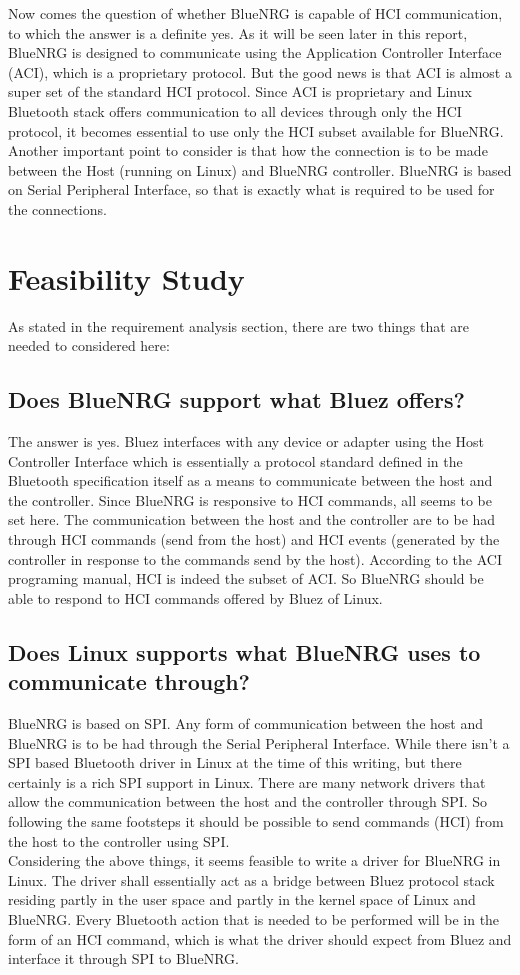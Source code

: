 Now comes the question of whether BlueNRG is capable of HCI communication, to which the answer is a definite yes. As it will be seen later in this report, BlueNRG is designed to communicate using the Application Controller Interface (ACI), which is a proprietary protocol. But the good news is that ACI is almost a super set of the standard HCI protocol. Since ACI is proprietary and Linux Bluetooth stack offers communication to all devices through only the HCI protocol, it becomes essential to use only the HCI subset available for BlueNRG. Another important point to consider is that how the connection is to be made between the Host (running on Linux) and BlueNRG controller. BlueNRG is based on Serial Peripheral Interface, so that is exactly what is required to be used for the connections. 
\section{Feasibility Study}
As stated in the requirement analysis section, there are two things that are needed to considered here:
\subsection{ Does BlueNRG support what Bluez offers?}
The answer is yes. Bluez interfaces with any device or adapter using the Host Controller Interface which is essentially a protocol standard defined in the Bluetooth specification itself as a means to communicate between the host and the controller. Since BlueNRG is responsive to HCI commands, all seems to be set here. The communication between the host and the controller are to be had through HCI commands (send from the host) and HCI events (generated by the controller in response to the commands send by the host). According to the ACI programing manual, HCI is indeed the subset of ACI. So BlueNRG should be able to respond to HCI commands offered by Bluez of Linux.
\subsection{Does Linux supports what BlueNRG uses to communicate through?}
BlueNRG is based on SPI. Any form of communication between the host and BlueNRG is to be had through the Serial Peripheral Interface. While there isn’t a SPI based Bluetooth driver in Linux at the time of this writing, but there certainly is a rich SPI support in Linux. There are many network drivers that allow the communication between the host and the controller through SPI. So following the same footsteps it should be possible to send commands (HCI) from the host to the controller using SPI.\\
Considering the above things, it seems feasible to write a driver for BlueNRG in Linux. The driver shall essentially act as a bridge between Bluez protocol stack residing partly in the user space and partly in the kernel space of Linux and BlueNRG. Every Bluetooth action that is needed to be performed will be in the form of an HCI command, which is what the driver should expect from Bluez and interface it through SPI to BlueNRG.
